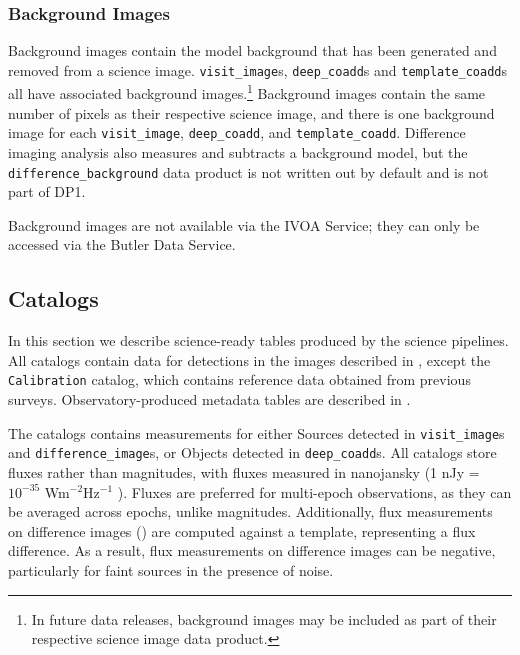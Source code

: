 \subsubsection{Background Images}
Background images contain the model \gls{background} that has been generated and removed from a science image.
\texttt{visit\_image}s, \texttt{deep\_coadd}s and \texttt{template\_coadd}s all have associated \gls{background} images.\footnote{In future data releases, \gls{background} images may be included as part of their respective science image data product.} Background images contain the same number of pixels as their respective science image, and there is one \gls{background} image for each \texttt{visit\_image}, \texttt{deep\_coadd}, and \texttt{template\_coadd}.
Difference imaging analysis also measures and subtracts a \gls{background} model, but the \texttt{difference\_background} data product is not written out by default and is not part of \gls{DP1}.

Background images are not available via the \gls{IVOA} Service; they can only be accessed via the \gls{Butler} Data Service.

\subsection{Catalogs}
\label{ssec:catalogs}
In this section  we describe science-ready tables produced by the science pipelines.
All catalogs contain data for detections in the images described in , except  the  \texttt{Calibration} catalog, which contains reference data obtained from previous surveys.
Observatory-produced \gls{metadata} tables are described in .

The catalogs contains measurements for either Sources  detected in  \texttt{visit\_image}s and \texttt{difference\_image}s, or Objects detected in \texttt{deep\_coadd}s.
All catalogs store fluxes rather than magnitudes, with fluxes measured in nanojansky (1 nJy = $10^{-35}$ Wm$^{-2}$Hz$^{-1}$ ).
Fluxes are preferred for multi-epoch observations, as they can be averaged across epochs, unlike magnitudes.
Additionally, flux measurements on difference images () are computed against a template, representing a flux difference.
As a result, flux measurements on difference images can be negative, particularly for faint sources in the presence of noise.

